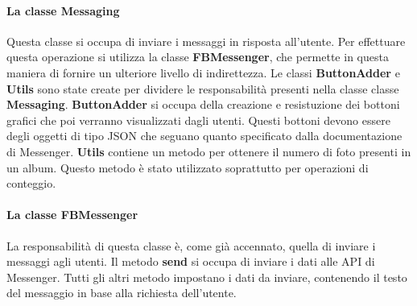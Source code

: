 \paragraph*{La classe Messaging} Questa classe si occupa di inviare i messaggi
in risposta all'utente. Per effettuare questa operazione si utilizza la classe
\textbf{FBMessenger}, che permette in questa maniera di fornire un ulteriore
livello di indirettezza. Le classi \textbf{ButtonAdder} e \textbf{Utils} sono
state create per dividere le responsabilità presenti nella classe classe
\textbf{Messaging}. \textbf{ButtonAdder} si occupa della creazione e
resistuzione dei bottoni grafici che poi verranno visualizzati dagli utenti.
Questi bottoni devono essere degli oggetti di tipo JSON che seguano quanto
specificato dalla documentazione di Messenger.
\textbf{Utils} contiene un metodo per ottenere il numero di foto presenti in un
album. Questo metodo è stato utilizzato soprattutto per operazioni di conteggio.

\paragraph*{La classe FBMessenger} La responsabilità di questa classe è, come
già accennato, quella di inviare i messaggi agli utenti. Il metodo
\textbf{send} si occupa di inviare i dati alle API di Messenger. Tutti gli
altri metodo impostano i dati da inviare, contenendo il testo del messaggio in
base alla richiesta dell'utente.


